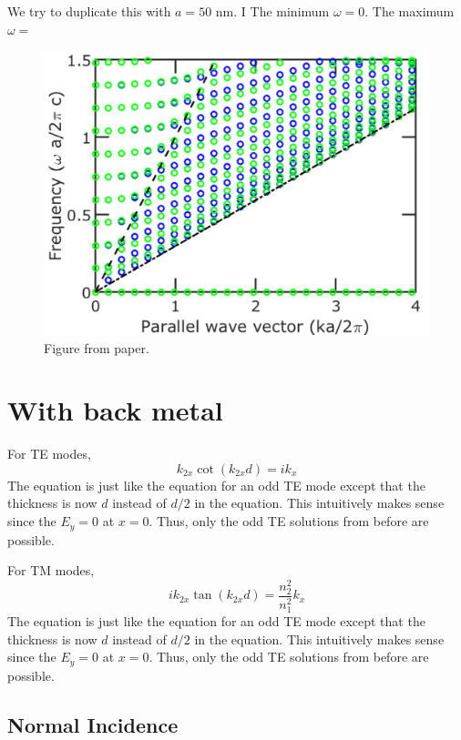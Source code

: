 \documentclass[12pt]{article}
\numberwithin{equation}{section}
\begin{document}
We try to duplicate this with $a = 50$ nm.  I
The minimum $\omega = 0$.  
The maximum $\omega = $

\begin{figure}[H]
\centering 
\vspace{-10pt}
\includegraphics[scale=.4]{Figures/JoannopoulosFigure}
\caption{Figure from paper.}
\vspace{-10pt}
\end{figure}

\section{With back metal}

For TE modes, 
\begin{equation}
\boxed{k_{2x} \cot (k_{2x} d ) = i k_x}
\end{equation}
The equation is just like the equation for an odd TE mode except that 
the thickness is now $d$ instead of $d/2$ in the equation.  
This intuitively makes sense since the $E_y = 0$ at $x = 0$.  Thus, only the odd TE solutions from before are possible.  

For TM modes, 
\begin{equation}
\boxed{i k_{2x}\tan (k_{2x} d ) = \frac{{n_2^2}}{n_1^2} k_x}
\end{equation}
The equation is just like the equation for an odd TE mode except that 
the thickness is now $d$ instead of $d/2$ in the equation.  
This intuitively makes sense since the $E_y = 0$ at $x = 0$.  Thus, only the odd TE solutions from before are possible.  
\subsection{Normal Incidence}
\end{document}
